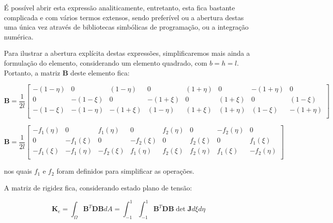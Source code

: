    É possível abrir esta expressão analiticamente, entretanto, esta fica bastante complicada e com vários termos extensos, sendo preferível ou a abertura destas uma única vez através de bibliotecas simbólicas de programação, ou a integração numérica.

    Para ilustrar a abertura explícita destas expressões, simplificaremos mais ainda a formulação do elemento, considerando um elemento quadrado, com $b=h=l$. Portanto, a matriz $\bm{B}$ deste elemento fica:

    \begin{equation}
        \mathbf{B} = 
        \frac{1}{2l}\begin{bmatrix}
            -\left(1-\eta\right) & 0 & \left(1-\eta\right) & 0 & \left(1+\eta\right) & 0 & -\left(1+\eta\right) & 0 \\
            0 & -\left(1-\xi\right) & 0 & -\left(1+\xi\right) & 0 & \left(1+\xi\right) & 0 & \left(1-\xi\right)\\
            -\left(1-\xi\right) & -\left(1-\eta\right) & -\left(1+\xi\right) & \left(1-\eta\right) & \left(1+\xi\right) & \left(1+\eta\right) & \left(1-\xi\right) & -\left(1+\eta\right)\\
        \end{bmatrix}
    \end{equation}

    \begin{equation}
        \mathbf{B} = 
        \frac{1}{2l}\begin{bmatrix}
            -f_1(\eta) & 0 & f_1(\eta) & 0 & f_2(\eta) & 0 & -f_2(\eta) & 0 \\
            0 & -f_1(\xi) & 0 & -f_2(\xi) & 0 & f_2(\xi) & 0 & f_1(\xi)\\
            -f_1(\xi) & -f_1(\eta) & -f_2(\xi) & f_1(\eta) & f_2(\xi) & f_2(\eta) & f_1(\xi) & -f_2(\eta)\\
        \end{bmatrix}
    \end{equation}

    \noindent nos quais $f_1$ e $f_2$ foram definidos para simplificar as operações.

    A matriz de rigidez fica, considerando estado plano de tensão:

    \begin{equation}
        \mathbf{K}_e = \int_\Omega  \mathbf{B}^T \mathbf{D} \mathbf{B} dA = \int_{-1}^{1} \int_{-1}^{1}  \mathbf{B}^T \mathbf{D} \mathbf{B} \det \mathbf{J} d\xi d\eta
    \end{equation}

